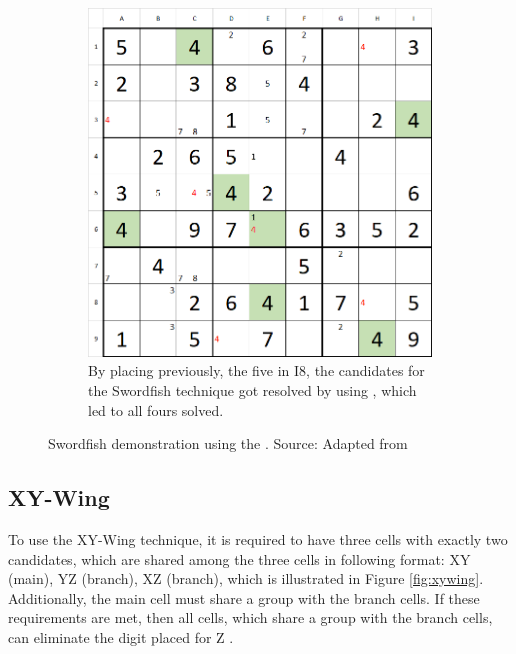 \documentclass[twoside]{ausarbeitung}
\begin{document}
\begin{figure}[H]
\begin{subfigure}[t]{.475\textwidth}
  \includegraphics[width=\linewidth]{images/sfish4.png}
  \caption{By placing previously, the five in I8, the candidates for the Swordfish technique got resolved by using , which led to all fours solved.}
  \label{fig:sfish4}
\end{subfigure}

\caption[Swordfish]{Swordfish demonstration using the . Source: Adapted from \cite{SudokuTr32:online}}

\label{fig:sfish}
\end{figure}


\subsection{XY-Wing} \label{sec:xywing}
To use the XY-Wing technique, it is required to have three cells with exactly two candidates, which are shared among the three cells in following format: XY (main), YZ (branch), XZ (branch), which is illustrated in Figure \ref{fig:xywing}. Additionally, the main cell must share a group with the branch cells. If these requirements are met, then all cells, which share a group with the branch cells, can eliminate the digit placed for Z \cite{SudokuXY59:online}.
\end{document}
